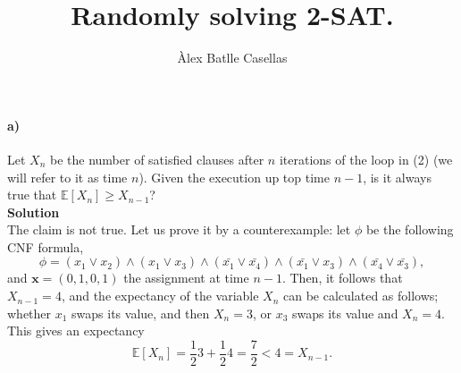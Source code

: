 \documentclass[10pt]{article}
\author{Àlex Batlle Casellas}
\title{Randomly solving \textsc{2-SAT}.}
\date{}
\begin{document}
\maketitle

\paragraph{a)} Let $X_n$ be the number of satisfied clauses after $n$ iterations of the loop in (2) (we will refer to it as time $n$). Given the execution up top time $n-1$, is it always true that $\mathbb{E}\left[X_n\right]\geq X_{n-1}$?\\
\textbf{Solution}\\
The claim is not true. Let us prove it by a counterexample: let $\phi$ be the following CNF formula, \[\phi=(x_1\vee x_2)\wedge(x_1\vee x_3)\wedge(\bar{x_1}\vee\bar{x_4})\wedge(\bar{x_1}\vee x_3)\wedge(\bar{x_4}\vee\bar{x_3}),\] and $\textbf{x}=(0,1,0,1)$ the assignment at time $n-1$. Then, it follows that $X_{n-1}=4$, and the expectancy of the variable $X_n$ can be calculated as follows; whether $x_1$ swaps its value, and then $X_n=3$, or $x_3$ swaps its value and $X_n=4$. This gives an expectancy
\[\mathbb{E}\left[X_n\right]=\dfrac{1}{2}3+\dfrac{1}{2}4=\dfrac{7}{2}<4=X_{n-1}.\]
\end{document}
